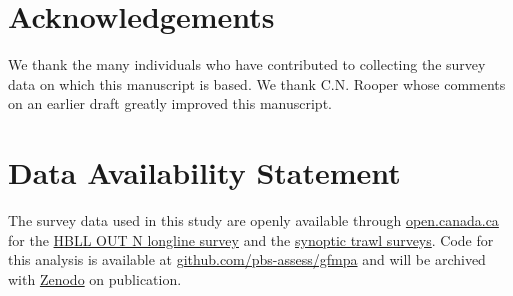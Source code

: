 \documentclass[12pt]{article}
\begin{document}



\section*{Acknowledgements}

We thank the many individuals who have contributed to collecting the survey data on which this manuscript is based.
We thank C.N. Rooper whose comments on an earlier draft greatly improved this manuscript.

\section*{Data Availability Statement}

The survey data used in this study are openly available through \href{open.canada.ca}{open.canada.ca} for the \href{https://open.canada.ca/data/en/dataset/524fde54-1d93-4d22-bb83-df542780a719}{HBLL OUT N longline survey} and the \href{https://open.canada.ca/data/en/dataset/a278d1af-d567-4964-a109-ae1e84cbd24a}{synoptic trawl surveys}.
Code for this analysis is available at \href{https://github.com/pbs-assess/gfmpa}{github.com/pbs-assess/gfmpa} and will be archived with \href{https://zenodo.org/}{Zenodo} on publication.
\end{document}
